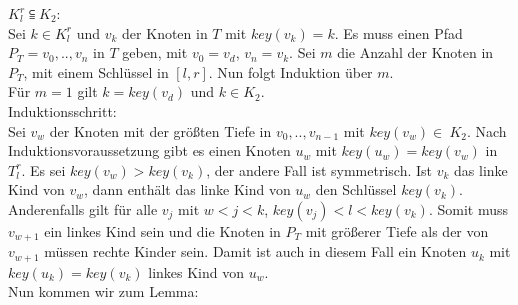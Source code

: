 \documentclass[a4paper,12pt]{article}
\begin{document}
 \noindent $ K^r_l \subseteqq K_2$:\\
 Sei $k \in K^r_l$ und $v_k$ der Knoten in $T$ mit $\mathit{key}(v_k) = k$. Es muss einen Pfad $P_T = v_0,..,v_n$ in $T$ geben, mit $v_0 = v_d$, $v_n = v_k$. Sei $m$ die Anzahl der Knoten in $P_T$, mit einem Schlüssel in  $\left[l,r\right]$. Nun folgt Induktion über $m$.\\
  Für $m = 1$ gilt $k = \mathit{key}\left(v_d\right)$  und $k \in K_2$. \\
  Induktionsschritt:\\
  Sei $v_w$ der Knoten mit der größten Tiefe in $ v_0,..,v_{n-1}$ mit $\mathit{key}(v_w) \in~K_2$. Nach Induktionsvoraussetzung gibt es einen Knoten $u_w$ mit $\mathit{key}(u_w) = \mathit{key}(v_w)$ in $T^r_l$.  Es sei $\mathit{key}(v_w) > \mathit{key}(v_k)$, der andere Fall ist symmetrisch. Ist $v_k$ das linke Kind von $v_w$, dann enthält das linke Kind von $u_w$ den Schlüssel $\mathit{key}(v_k)$. Anderenfalls gilt für alle $v_j$ mit $w < j < k$, $\mathit{key}(v_j) < l < \mathit{key}(v_k)$. Somit muss $v_{w+1}$ ein linkes Kind sein und die Knoten in $P_T$ mit größerer Tiefe als der von $v_{w+1}$ müssen rechte Kinder sein. Damit ist auch in diesem Fall ein Knoten $u_k$ mit $\mathit{key}(u_k) = \mathit{key}(v_k)$ linkes Kind von $u_w$.  \\
  
 \noindent Nun kommen wir zum Lemma:\\
 
 


	    
	 
\end{document}
